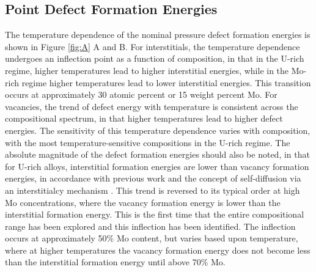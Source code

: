 \documentclass[default]{sn-jnl}%
\begin{document}
\subsection{Point Defect Formation Energies}
The temperature dependence of the nominal pressure defect formation energies is shown in Figure \ref{fig:A} A and B. For interstitials, the temperature dependence undergoes an inflection point as a function of composition, in that in the U-rich regime, higher temperatures lead to higher interstitial energies, while in the Mo-rich regime higher temperatures lead to lower interstitial energies. This transition occurs at approximately 30 atomic percent or 15 weight percent Mo. For vacancies, the trend of defect energy with temperature is consistent across the compositional spectrum, in that higher temperatures lead to higher defect energies. The sensitivity of this temperature dependence varies with composition, with the most temperature-sensitive compositions in the U-rich regime. The absolute magnitude of the defect formation energies should also be noted, in that for U-rich alloys, interstitial formation energies are lower than vacancy formation energies, in accordance with previous work \cite{beeler2010,beelerAIMD,smirnova2015} and the concept of self-diffusion via an interstitialcy mechanism \cite{park2021}. This trend is reversed to its typical order at high Mo concentrations, where the vacancy formation energy is lower than the interstitial formation energy. This is the first time that the entire compositional range has been explored and this inflection has been identified. The inflection occurs at approximately 50\% Mo content, but varies based upon temperature, where at higher temperatures the vacancy formation energy does not become less than the interstitial formation energy until above 70\% Mo. 
\end{document}
